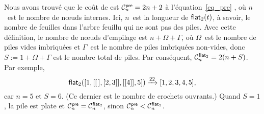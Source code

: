 Nous avons trouvé que le coût de 
est \(\C{\fun{pre}}{n} = 2n+2\) à
l'équation~\eqref{eq_pre} , où \(n\)~est le nombre de
n{\oe}uds internes. Ici, \(n\)~est la longueur de
\(\fun{flat}_2(t)\), à savoir, le
nombre de feuilles dans l'arbre feuillu qui ne sont pas des
piles. Avec cette définition, le nombre de n{\oe}uds d'empilage est
\(n + \Omega + \Gamma\), où \(\Omega\)~est le nombre de piles vides
imbriquées et \(\Gamma\)~est le nombre de piles imbriquées non-vides,
donc \(S := 1 + \Omega + \Gamma\) est le nombre total de piles. Par
conséquent, \(\C{\fun{flat}_2}{n} = 2(n +
S)\). Par exemple,
\begin{equation*}
\fun{flat}_2([1,[\el,[2,3]],[[4]],5]) \xrightarrow{22} [1,2,3,4,5],
\end{equation*}
car \(n=5\) et \(S=6\). (Ce dernier est le nombre de crochets
ouvrants.)  Quand \(S=1\), la pile est plate et \(\C{\fun{pre}}{n} =
\C{\fun{flat}_2}{n}\), sinon \(\C{\fun{pre}}{n} <
\C{\fun{flat}_2}{n}\).

\label{inorder}

